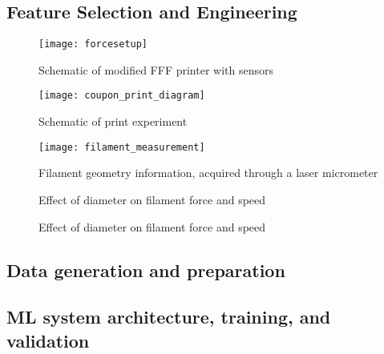 \documentclass[main.tex]{subfiles}
\begin{document}
\subsection{Feature Selection and Engineering} \label{ssec:ml_fs}
\begin{figure}[!htbp]
	\center
	\texttt{[image: forcesetup]}
	\caption{Schematic of modified FFF printer with sensors} \label{fig:shakira}
\end{figure}

\begin{figure}[!htbp]
	\center
	\texttt{[image: coupon\_print\_diagram]}
	\caption{Schematic of print experiment} \label{fig:print_dia}
\end{figure}

\begin{figure}[!htbp]
	\center
	\texttt{[image: filament\_measurement]}
	\caption{Filament geometry information, acquired through a laser micrometer } \label{fig:FD}
\end{figure}

\begin{figure}[h]
	\center
	\linebreak
	\caption{Effect of diameter on filament force and speed} \label{fig:dia_f_sp}
\end{figure}

\begin{figure}[h]
	\center
	\linebreak
	\caption{Effect of diameter on filament force and speed} \label{fig:ov_f_sp}
\end{figure}

\subsection{Data generation and preparation}\label{ssec:datag}

\subsection{ML system architecture, training, and validation}\label{ssec:MLA}
\end{document}
